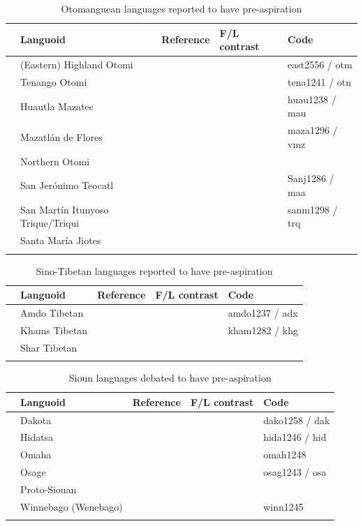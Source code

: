 \documentclass[output=paper]{langscibook}
\begin{document}
\begin{paperappendix}
\begin{table}
\begin{tabularx}{\textwidth}{@{}l@{}QQQl}
\lsptoprule
& Languoid & Reference & F/L contrast & Code\\
\midrule
  & (Eastern) Highland Otomi & \citet{BlightPike1976} &  & east2556 / otm\\
& Tenango Otomi & \citet{BlightPike1976} &  & tena1241 / otn\\
& Huautla Mazatec & \citet{Silverman2003} &  & huau1238 / mau\\
& Mazatlán de Flores & \citet{Silverman2003} &  & maza1296 / vmz\\
& Northern Otomi & \citet{Palancar2013} & \citet[4]{Palancar2013} & \\
& San Jerónimo Teocatl & \citet{Silverman2003} &  & Sanj1286 / maa\\
& San Martín Itunyoso Trique/Triqui & \citet{DiCanio2012} & \citet{DiCanio2012} & sanm1298 / trq\\
& Santa María Jiotes & \citet{Silverman2003} &  & \\
\lspbottomrule
\end{tabularx}
\caption{Otomanguean languages reported to have pre-aspiration}
\label{tab:key:8}
\end{table}


\begin{table}
\begin{tabularx}{\textwidth}{@{}l@{}QQQl}
\lsptoprule
& Languoid & Reference & F/L contrast & Code\\
\midrule
  & Amdo Tibetan & \citet{Suzuki2011} &  & amdo1237 / adx\\
& Khams Tibetan & \citet{Suzuki2011} &  & kham1282 / khg\\
& Shar Tibetan & \citet{Suzuki2011} &  & \\
\lspbottomrule
\end{tabularx}
\caption{Sino-Tibetan languages reported to have pre-aspiration}
\label{tab:key:9}
\end{table}


\begin{table}
\begin{tabularx}{\textwidth}{@{}l@{}QQQl}
\lsptoprule
& Languoid & Reference & F/L contrast & Code\\
\midrule
  & Dakota & \citet{Rankin2003} &  & dako1258 / dak\\
& Hidatsa & \citet{TorresKasak2019} &  & hida1246 / hid\\
& Omaha & \citet{Rankin2003} &  & omah1248\\
& Osage & \citet{Rankin2003} &  & osag1243 / osa\\
& Proto-Siouan & \citet{Rankin2003} &  & \\
& Winnebago (Wenebago) & \citet{Rankin2003} &  & winn1245\\
\lspbottomrule
\end{tabularx}
\caption{Sioun languages debated to have pre-aspiration}
\label{tab:key:10}
\end{table}



\end{paperappendix}
\end{document}

